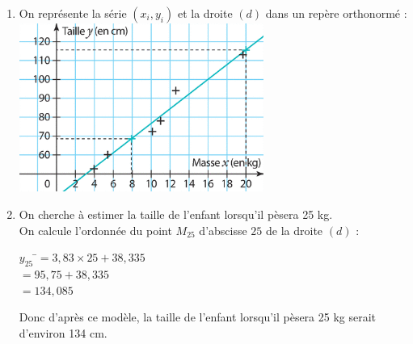 \documentclass[a4paper,11pt,exos]{nsi} %
\begin{document}
{\begin{enumerate}
        \begin{tabbing}
            $m$\= $=\dfrac{\mathrm{Cov}(x,y)}{\mathrm{Var}(x)}$\\
            \> $=\dfrac{101,68}{26,58}$\\
            \> $\approx 3,83$
        \end{tabbing}
        Donc l'équation de la droite $(d)$ d'ajustement affine de la série $(x_i,y_i)$ est :
        \begin{tabbing}
            $y$\= $=3,83(x-10,5)+78,5$\\
            \> $=3,83x-40,165+78,5$\\
            \> $=3,83x+38,335$
        \end{tabbing}
        \item On représente la série $(x_i,y_i)$ et la droite $(d)$ dans un repère orthonormé :\\[.5em]
         \includegraphics[width=8cm]{Exp232Sesamath.png}
        \item On cherche à estimer la taille de l'enfant lorsqu'il pèsera 25 kg.\\
        On calcule l'ordonnée du point $M_{25}$ d'abscisse $25$ de la droite $(d)$ :
        \begin{tabbing}
            $y_{25}$    \=$=3,83\times 25+38,335$\\
            \> $=95,75+38,335$\\
            \> $=134,085$
        \end{tabbing}
        Donc d'après ce modèle, la taille de l'enfant lorsqu'il pèsera 25 kg serait d'environ 134 cm.
    \end{enumerate}
}
\end{document}
